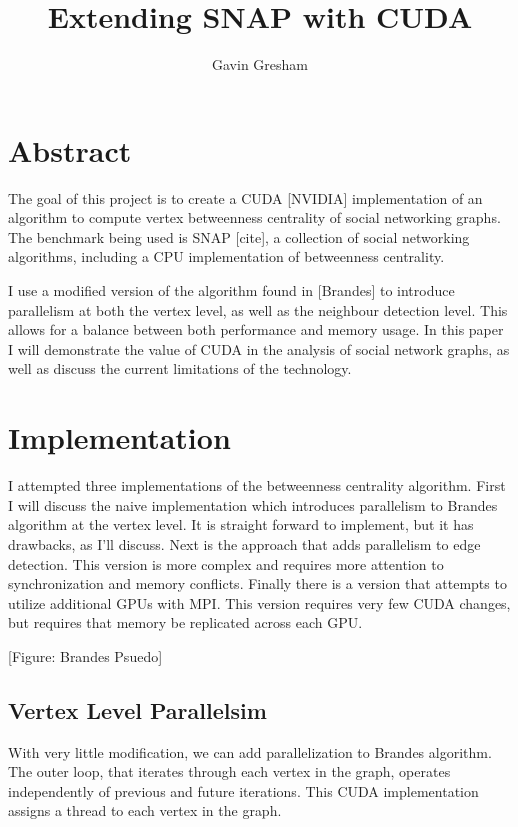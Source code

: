 \documentclass[10pt,twocolumn]{article}
\begin{document}
\title{Extending SNAP with CUDA}
\author{Gavin Gresham}
\maketitle

\section{Abstract}
The goal of this project is to create a CUDA [NVIDIA] implementation of an algorithm to compute vertex betweenness centrality of social networking graphs. The benchmark being used is SNAP [cite], a collection of social networking algorithms, including a CPU implementation of betweenness centrality. 
 
I use a modified version of the algorithm found in [Brandes] to introduce parallelism at both the vertex level, as well as the neighbour detection level. This allows for a balance between both performance and memory usage. In this paper I will demonstrate the value of CUDA in the analysis of social network graphs, as well as discuss the current limitations of the technology.
 
\section{Implementation}
I attempted three implementations of the betweenness centrality algorithm. First I will discuss the naive implementation which introduces parallelism to Brandes algorithm at the vertex level. It is straight forward to implement, but it has drawbacks, as I'll discuss. Next is the approach that adds parallelism to edge detection. This version is more complex and requires more attention to synchronization and memory conflicts. Finally there is a version that attempts to utilize additional GPUs with MPI. This version requires very few CUDA changes, but requires that memory be replicated across each GPU.
 
[Figure: Brandes Psuedo]
 
\subsection{Vertex Level Parallelsim}
With very little modification, we can add parallelization to Brandes algorithm. The outer loop, that iterates through each vertex in the graph, operates independently of previous and future iterations. This CUDA implementation assigns a thread to each vertex in the graph.
 
\end{document}

